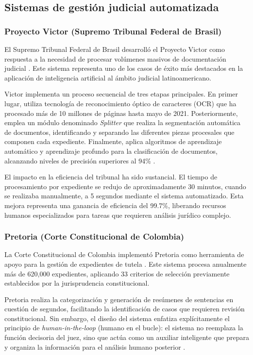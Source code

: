 \documentclass[12pt,a4paper,oneside]{book}
\begin{document}
\subsection{Sistemas de gestión judicial automatizada}

\subsubsection{Proyecto Victor (Supremo Tribunal Federal de Brasil)}

El Supremo Tribunal Federal de Brasil desarrolló el Proyecto Victor como respuesta a la necesidad de procesar volúmenes masivos de documentación judicial \cite{stf2021victor}. Este sistema representa uno de los casos de éxito más destacados en la aplicación de inteligencia artificial al ámbito judicial latinoamericano.

Victor implementa un proceso secuencial de tres etapas principales. En primer lugar, utiliza tecnología de reconocimiento óptico de caracteres (OCR) que ha procesado más de 10 millones de páginas hasta mayo de 2021. Posteriormente, emplea un módulo denominado \textit{Splitter} que realiza la segmentación automática de documentos, identificando y separando las diferentes piezas procesales que componen cada expediente. Finalmente, aplica algoritmos de aprendizaje automático y aprendizaje profundo para la clasificación de documentos, alcanzando niveles de precisión superiores al 94\% \cite{stf2021victor}.

El impacto en la eficiencia del tribunal ha sido sustancial. El tiempo de procesamiento por expediente se redujo de aproximadamente 30 minutos, cuando se realizaba manualmente, a 5 segundos mediante el sistema automatizado. Esta mejora representa una ganancia de eficiencia del 99.7\%, liberando recursos humanos especializados para tareas que requieren análisis jurídico complejo.

\subsubsection{Pretoria (Corte Constitucional de Colombia)}

La Corte Constitucional de Colombia implementó Pretoria como herramienta de apoyo para la gestión de expedientes de tutela \cite{corteconstitucional2020pretoria}. Este sistema procesa anualmente más de 620,000 expedientes, aplicando 33 criterios de selección previamente establecidos por la jurisprudencia constitucional.

Pretoria realiza la categorización y generación de resúmenes de sentencias en cuestión de segundos, facilitando la identificación de casos que requieren revisión constitucional. Sin embargo, el diseño del sistema enfatiza explícitamente el principio de \textit{human-in-the-loop} (humano en el bucle): el sistema no reemplaza la función decisoria del juez, sino que actúa como un auxiliar inteligente que prepara y organiza la información para el análisis humano posterior \cite{corteconstitucional2020pretoria}.
\end{document}

